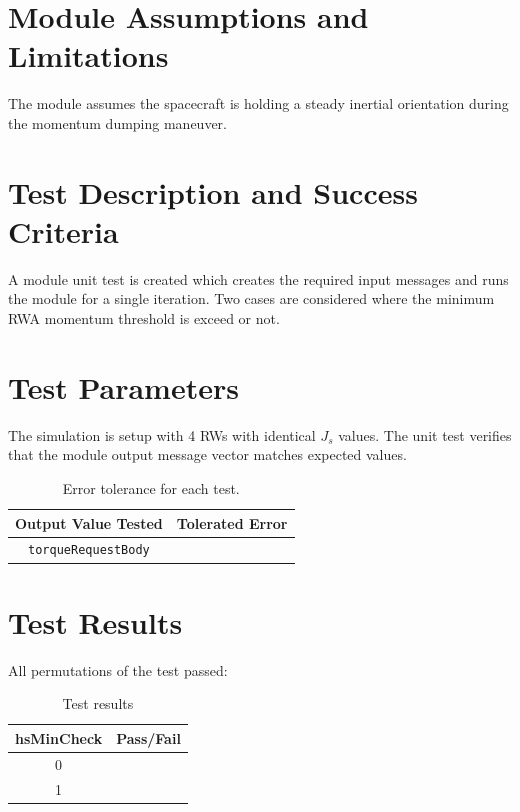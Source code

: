 \documentclass[]{BasiliskReportMemo}
\begin{document}
\section{Module Assumptions and Limitations}
The module assumes the spacecraft is holding a steady inertial orientation during the momentum dumping maneuver.  










\section{Test Description and Success Criteria}
A module unit test is created which creates the required input messages and runs the module for a single iteration.  Two cases are considered where the minimum RWA momentum threshold is exceed or not.




\section{Test Parameters}
The simulation is setup with 4  RWs with identical $J_{s}$ values.  
The unit test verifies that the module output  message vector matches expected values.
\begin{table}[htbp]
	\caption{Error tolerance for each test.}
	\label{tab:errortol}
	\centering \fontsize{10}{10}\selectfont
	\begin{tabular}{ c | c } %
		\hline\hline
		\textbf{Output Value Tested}  & \textbf{Tolerated Error}  \\ 
		\hline
		{\tt torqueRequestBody}        & 	   \\ 
		\hline\hline
	\end{tabular}
\end{table}




\section{Test Results}
All permutations of the test passed:
\begin{table}[h]
	\caption{Test results}
	\label{tab:results}
	\centering \fontsize{10}{10}\selectfont
	\begin{tabular}{c | c  } %
		\hline\hline
		\textbf{hsMinCheck} 	&\textbf{Pass/Fail} \\ 
		\hline
	   0	   			&  \\ 
	   1 	   			&  \\ 
	   \hline\hline
	\end{tabular}
\end{table}
\end{document}
